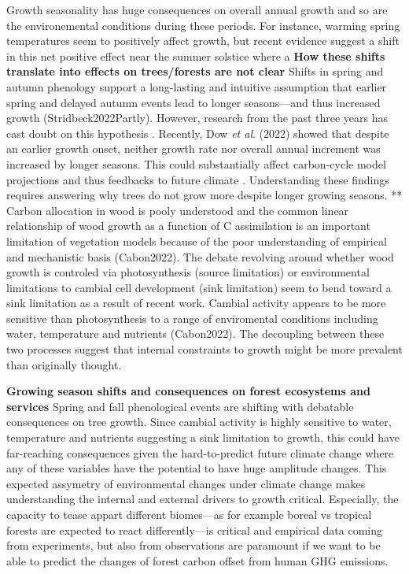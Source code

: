 \documentclass{article}
\begin{document}
Growth seasonality has huge consequences on overall annual growth and so are the environemental conditions during these periods. For instance, warming spring temperatures seem to positively affect growth, but recent evidence suggest a shift in this net positive effect near the summer solstice where a
\textbf{How these shifts translate into effects on trees/forests are not clear}
Shifts in spring and autumn phenology support a long-lasting and intuitive assumption that earlier spring and delayed autumn events lead to longer seasons---and thus increased growth \cite{keenan_net_2014} (Stridbeck2022Partly). However, research from the past three years has cast doubt on this hypothesis \cite{dow_warm_2022,green_limits_2022,silvestro_longer_2023}. Recently, Dow \textit{et al}. (2022) showed that despite an earlier growth onset, neither growth rate nor overall annual increment was increased by longer seasons. This could substantially affect carbon-cycle model projections and thus feedbacks to future climate \cite{richardson_climate_2013,swidrak_comparing_2013}. 
Understanding these findings requires answering why trees do not grow more despite longer growing seasons. ** Carbon allocation in wood is pooly understood and the common linear relationship of wood growth as a function of C assimilation is an important limitation of vegetation models because of the poor understanding of empirical and mechanistic basis (Cabon2022). The debate revolving around whether wood growth is controled via photosynthesis (source limitation) or environmental limitations to cambial cell development (sink limitation) seem to bend toward a sink limitation as a result of recent work. Cambial activity appears to be more sensitive than photosynthesis to a range of enviromental conditions including water, temperature and nutrients (Cabon2022). The decoupling between these two processes suggest that internal constraints to growth might be more prevalent than originally thought.

\textbf{Growing season shifts and consequences on forest ecosystems and services}
Spring and fall phenological events are shifting with debatable consequences on tree growth. Since cambial activity is highly sensitive to water, temperature and nutrients suggesting a sink limitation to growth, this could have far-reaching consequences given the hard-to-predict future climate change where any of these variables have the potential to have huge amplitude changes. This expected assymetry of environmental changes under climate change makes understanding the internal and external drivers to growth critical. Especially, the capacity to tease appart different biomes---as for example boreal vs tropical forests are expected to react differently---is critical and empirical data coming from experiments, but also from observations are paramount if we want to be able to predict the changes of forest carbon offset from human GHG emissions.  
\end{document}
